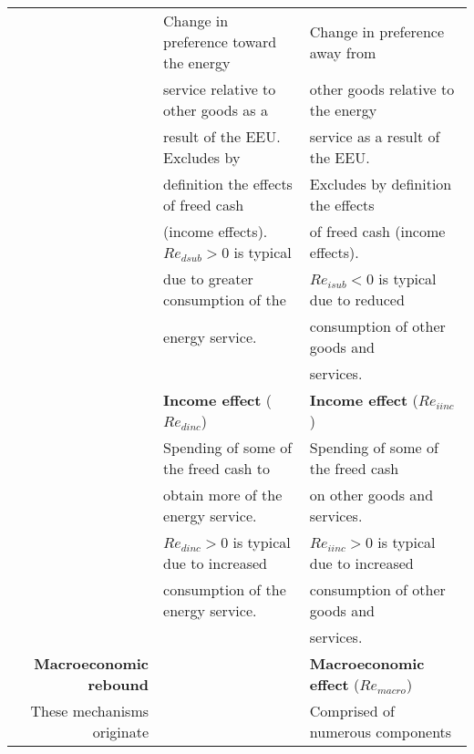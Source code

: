 \begin{table}
\begin{center}
\begin{tabular}{ r l l }
                                   & Change in preference toward the energy       & Change in preference away from  \\
                                   & service relative to other goods as a         & other goods relative to the energy  \\
                                   & result of the EEU. Excludes by               & service as a result of the EEU.  \\
                                   & definition the effects of freed cash         & Excludes by definition the effects \\ 
                                   & (income effects). $Re_{dsub} > 0$ is typical & of freed cash (income effects).     \\ 
                                   & due to greater consumption of the            & $Re_{isub} < 0$ is typical due to reduced    \\
                                   & energy service.                              & consumption of other goods and   \\
                                   &                                              & services. \\
                                   \cmidrule{2-3}
                                   & \textbf{Income effect} ($Re_{dinc}$)         & \textbf{Income effect} ($Re_{iinc}$) \\
                                   & Spending of some of the freed cash to        & Spending of some of the freed cash   \\
                                   & obtain more of the energy service.           & on other goods and services.   \\
                                   & $Re_{dinc} > 0$ is typical due to increased  & $Re_{iinc} > 0$ is typical due to increased    \\ 
                                   & consumption of the energy service.           & consumption of other goods and   \\
                                   &                                              & services. \\
\midrule
\textbf{Macroeconomic rebound}     &                                              & \textbf{Macroeconomic effect} ($Re_{macro}$) \\
These mechanisms originate         &                                              & Comprised of numerous components \\

\end{tabular}
\end{center}
\end{table}
